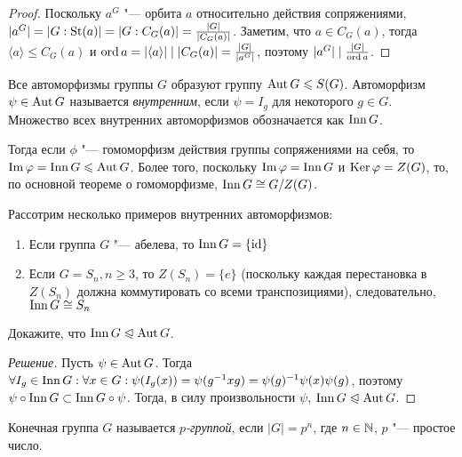 \begin{proof}
	Поскольку $a^G$ "--- орбита $a$ относительно действия сопряжениями, $|a^G| \hm= |G : \St(a)| = |G : C_G(a)| = \frac{|G|}{|C_G(a)|}$. Заметим, что $a \in C_G(a)$, тогда $\langle a \rangle \le C_G(a)$ и $\ord{a} \hm= |\langle a \rangle| \mid |C_G(a)| = \frac{|G|}{|a^G|}$, поэтому $|a^G| \mid \frac{|G|}{\operatorname{ord} a}$.
\end{proof}

\begin{definition}
	Все автоморфизмы группы $G$ образуют группу $\operatorname{Aut} G \leqslant S(G)$. Автоморфизм $\psi \in \operatorname{Aut} G$ называется \textit{внутренним}, если $\psi = I_g$ для некоторого $g \in G$. Множество всех внутренних автоморфизмов обозначается как $\operatorname{Inn} G$.
\end{definition}

\begin{note}
	Тогда если $\phi$ "--- гомоморфизм действия группы сопряжениями на себя, то $\im\phi \hm= \Inn G \le \Aut G$. Более того, поскольку $\operatorname{Im}\varphi = \operatorname{Inn} G$ и $\operatorname{Ker}\varphi = Z(G)$, то, по основной теореме о гомоморфизме, $\operatorname{Inn} G \cong G / Z(G)$.
\end{note}

\begin{example}
	Рассотрим несколько примеров внутренних автоморфизмов:
	\begin{enumerate}
		\item Если группа $G$ "--- абелева, то $\operatorname{Inn}{G} = \{\operatorname{id}\}$
		\item Если $G = S_n, n \ge 3$, то $Z(S_n) = \{e\}$ (поскольку каждая перестановка в $Z(S_n)$ должна коммутировать со всеми транспозициями), следовательно, $\operatorname{Inn}{G} \cong S_n$
	\end{enumerate}
\end{example}

\begin{exercise}
	Докажите, что $\operatorname{Inn}{G} \trianglelefteqslant \operatorname{Aut}{G}$.
\end{exercise}

\begin{proof}[Решение]
	Пусть $\psi \in \operatorname{Aut}{G}$. Тогда $\forall I_g \in \Inn{G}: \forall x \hm\in G: \psi(I_g(x)) \hm= \psi(g^{-1}xg) \hm= \psi(g)^{-1}\psi(x)\psi(g)$, поэтому $\psi\circ\operatorname{Inn}{G} \subset \operatorname{Inn}{G}\circ\psi$. Тогда, в силу произвольности $\psi$, $\Inn{G} \hm\normal \Aut{G}$.
\end{proof}

\begin{definition}
	Конечная группа $G$ называется \textit{$p$-группой}, если $|G| = p^n$, где $n \in \mathbb{N}$, $p$ "--- простое число.
\end{definition}

